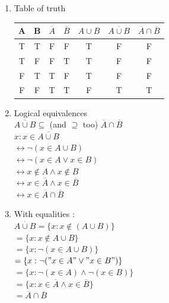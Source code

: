 \documentclass[12pt,a4paper]{article}
\begin{document}
\begin{enumerate}
	\item Table of truth \begin{center}
	\begin{tabular}{cc|ccccc}
		A & B & $\overline{A}$ & $\overline{B}$ & $A \cup B$ & $\overline{A \cup B}$ & $\overline{A} \cap \overline{B}$ \\ 
		\hline
		 T & T & F & F & T & F & F \\ 
		 T & F & F & T & T & F & F \\ 
		 F & T & T & F & T & F & F \\ 
		 F & F & T & T & F & T & T \\ 
	\end{tabular}
	\end{center}
\item Logical equivalences\\ $\overline{A \cup B} \subseteq$ (and $\supseteq$ too) $\overline{A} \cap \overline{B}$ \\
$x : x \in \overline{A \cup B}$\\
$\leftrightarrow \neg (x \in A \cup B)$\\
$\leftrightarrow \neg (x \in A \vee x \in B)$\\
$\leftrightarrow x \not \in A \wedge x \not \in B$\\
$\leftrightarrow x \in \overline{A} \wedge x \in \overline{B}$\\
$\leftrightarrow x \in \overline{A} \cap \overline{B}$\\

\item With equalities :\\
$\overline{A \cup B} = \{x : x \not\in (A \cup B)\}$\\
$= \{x : x \not \in A \cup B\}$\\
$= \{x : \neg (x \in A \cup B)\}$\\
$= \{x : \neg ("x \in A" \vee "x \in B")\}$\\
$= \{x : \neg (x \in A) \wedge \neg (x\in B)\}$\\
$= \{x : x \in \overline{A} \wedge x \in \overline{B}\}$\\
$= \overline{A} \cap \overline{B}$
\end{enumerate}
\end{document}
